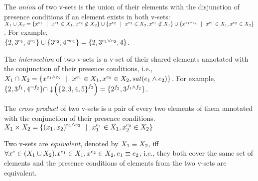 %
\begin{definition}
\label{def:vset-union}
The \emph {union} of two v-sets is the union of their elements with the disjunction of 
presence conditions if an element exists in both v-sets:
\ensuremath{
\vset_1 \cup \vset_2 = \setDef {\annot [\dimMeta_1] \elem \myOR \annot [\dimMeta_1] \elem \in \vset_1, \annot [\dimMeta_2] \elem \not \in \vset_2}
\cup \setDef {\annot [\dimMeta_2] \elem \myOR \annot [\dimMeta_2] \elem \in \vset_2, \annot [\dimMeta_1] \elem  \not \in \vset_1}
\cup \setDef {\annot [\dimMeta_1 \vee \dimMeta_2] \elem \myOR 
\annot [\dimMeta_1] \elem \in \vset_1, \annot [\dimMeta_2] \elem \in \vset_2}
}.
For example, \\
\ensuremath{
\setDef {2,\annot [\dimMeta_1] 3, \annot [\dimMeta_1] 4} \cup \setDef {\annot [\dimMeta_2] 3, \annot [\neg \dimMeta_1] 4} = \setDef {2, \annot [\dimMeta_1 \vee \dimMeta_2] 3, 4}
}.
\end{definition}

% 
\begin{definition}
\label{def:vset-intersect}
The \emph{intersection} of two v-sets is a v-set of their shared elements
annotated with the conjunction of their presence conditions, i.e., 
\ensuremath{
\vset_1 \cap \vset_2 = \setDef {
\annot [\dimMeta_1 \wedge \dimMeta_2 ]\elem \myOR
\annot [\dimMeta_1] \elem \in \vset_1, \annot [\dimMeta_2] \elem \in \vset_2,
\sat {\dimMeta_1 \wedge \dimMeta_2}
}
}.
For example, \ensuremath{
\setDef {2, \annot [\A] 3, \annot [\neg \B] 4} \cap
\pushIn {\annot [\B] {\setDef{2,3,4,5}}} =
\setDef{\annot [\B] 2, \annot [\A \wedge \B] 3}
}.
\end{definition}

\begin{definition} 
\label{def:vset-cross}
The \emph{cross product} of two v-sets is a pair of every two elements of 
them annotated with the conjunction of their presence conditions.
\ensuremath{
\vset_1 \times \vset_2 = \setDef{
\annot [\dimMeta_1 \wedge \dimMeta_2] {(\elem_1, \elem_2)} \myOR
\annot [\dimMeta_1] \elem_1 \in \vset_1, \annot [\dimMeta_2] \elem_2 \in \vset_2
}
}
%
\end{definition}

\begin{definition} 
\label{def:vset-eq}
Two v-sets are \emph{equivalent}, denoted by
\ensuremath{\vset_1 \equiv \vset_2}, iff
\ensuremath{
\forall \annot  \elem \in (\vset_1 \cup \vset_2). 
\annot [\dimMeta_1] \elem \in \vset_1, \annot [\dimMeta_2] \elem \in \vset_2, 
\dimMeta_1 \equiv \dimMeta_2},
i.e., they both cover the same set of elements and the presence conditions
of elements from the two v-sets are equivalent.
\end{definition}

